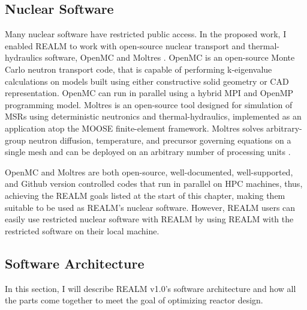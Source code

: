\subsection{Nuclear Software}
Many nuclear software have restricted public access. 
In the proposed work, I enabled \gls{REALM} to work with open-source nuclear 
transport and thermal-hydraulics software, OpenMC \cite{romano_openmc_2013} 
and Moltres \cite{lindsay_introduction_2018}.  
OpenMC is an open-source Monte Carlo neutron transport code, that is capable of 
performing k-eigenvalue calculations on models built using either constructive 
solid geometry or CAD representation. 
OpenMC can run in parallel using a hybrid MPI and OpenMP programming model. 
Moltres is an open-source tool designed for simulation of \glspl{MSR} using 
deterministic neutronics and thermal-hydraulics, implemented as an application 
atop the \gls{MOOSE} finite-element framework.  
Moltres solves arbitrary-group neutron diffusion, temperature, and precursor 
governing equations on a single mesh and can be deployed on an arbitrary number 
of processing units \cite{lindsay_introduction_2018}.

OpenMC and Moltres are both open-source, well-documented, well-supported, and 
Github version controlled codes that run in parallel on \gls{HPC} machines, 
thus, achieving the \gls{REALM} goals listed at the start of this chapter, 
making them suitable to be used as \gls{REALM}'s nuclear software.
However, \gls{REALM} users can easily use restricted nuclear software with 
\gls{REALM} by using \gls{REALM} with the restricted software on their local 
machine. 

\subsection{Software Architecture}
In this section, I will describe \gls{REALM} v1.0's software architecture and 
how all the parts come together to meet the goal of optimizing reactor 
design. 

